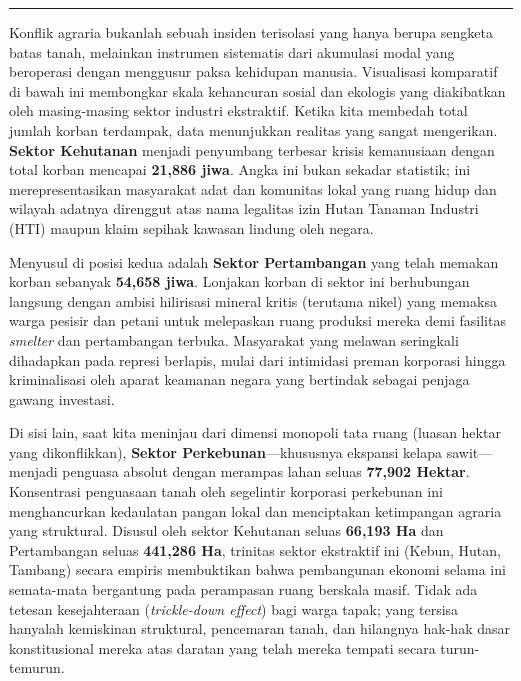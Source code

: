 \documentclass[
]{article}
\begin{document}
\begin{center}\rule{0.5\linewidth}{0.5pt}\end{center}

Konflik agraria bukanlah sebuah insiden terisolasi yang hanya berupa
sengketa batas tanah, melainkan instrumen sistematis dari akumulasi
modal yang beroperasi dengan menggusur paksa kehidupan manusia.
Visualisasi komparatif di bawah ini membongkar skala kehancuran sosial
dan ekologis yang diakibatkan oleh masing-masing sektor industri
ekstraktif. Ketika kita membedah total jumlah korban terdampak, data
menunjukkan realitas yang sangat mengerikan. \textbf{Sektor Kehutanan}
menjadi penyumbang terbesar krisis kemanusiaan dengan total korban
mencapai \textbf{21,886 jiwa}. Angka ini bukan sekadar statistik; ini
merepresentasikan masyarakat adat dan komunitas lokal yang ruang hidup
dan wilayah adatnya direnggut atas nama legalitas izin Hutan Tanaman
Industri (HTI) maupun klaim sepihak kawasan lindung oleh negara.

Menyusul di posisi kedua adalah \textbf{Sektor Pertambangan} yang telah
memakan korban sebanyak \textbf{54,658 jiwa}. Lonjakan korban di sektor
ini berhubungan langsung dengan ambisi hilirisasi mineral kritis
(terutama nikel) yang memaksa warga pesisir dan petani untuk melepaskan
ruang produksi mereka demi fasilitas \emph{smelter} dan pertambangan
terbuka. Masyarakat yang melawan seringkali dihadapkan pada represi
berlapis, mulai dari intimidasi preman korporasi hingga kriminalisasi
oleh aparat keamanan negara yang bertindak sebagai penjaga gawang
investasi.

Di sisi lain, saat kita meninjau dari dimensi monopoli tata ruang
(luasan hektar yang dikonflikkan), \textbf{Sektor
Perkebunan}---khususnya ekspansi kelapa sawit---menjadi penguasa absolut
dengan merampas lahan seluas \textbf{77,902 Hektar}. Konsentrasi
penguasaan tanah oleh segelintir korporasi perkebunan ini menghancurkan
kedaulatan pangan lokal dan menciptakan ketimpangan agraria yang
struktural. Disusul oleh sektor Kehutanan seluas \textbf{66,193 Ha} dan
Pertambangan seluas \textbf{441,286 Ha}, trinitas sektor ekstraktif ini
(Kebun, Hutan, Tambang) secara empiris membuktikan bahwa pembangunan
ekonomi selama ini semata-mata bergantung pada perampasan ruang berskala
masif. Tidak ada tetesan kesejahteraan (\emph{trickle-down effect}) bagi
warga tapak; yang tersisa hanyalah kemiskinan struktural, pencemaran
tanah, dan hilangnya hak-hak dasar konstitusional mereka atas daratan
yang telah mereka tempati secara turun-temurun.
\end{document}
